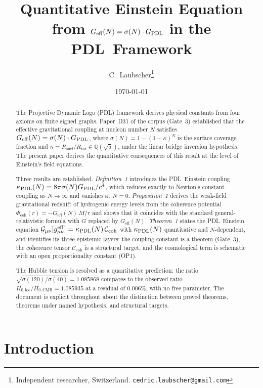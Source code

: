 \documentclass[11pt,a4paper]{article}
\theoremstyle{definition}
\newcommand{\PDL}{\textnormal{PDL}}
\newcommand{\Rsurf}{R_{\mathrm{surf}}}
\newcommand{\Rtot}{R_{\mathrm{tot}}}
\newcommand{\GPDL}{G_{\PDL}}
\newcommand{\Geff}{G_{\mathrm{eff}}}
\newcommand{\sig}{\sigma}
\newcommand{\kap}{\kappa}
\newcommand{\kPDL}{\kappa_{\PDL}}
\newcommand{\Ccoh}{\mathcal{C}_{\mathrm{coh}}}
\newcommand{\geff}{g^{\mathrm{eff}}_{\mu\nu}}
\newcommand{\Gcal}{\mathcal{G}_{\mu\nu}}
\newcommand{\Phicoh}{\Phi_{\mathrm{coh}}}
\begin{document}
\title{Quantitative Einstein Equation from $G_{\mathrm{eff}}(N) = \sigma(N)\cdot G_{\PDL}$ in the \PDL\ Framework}
\author{C.~Laubscher\thanks{Independent researcher, Switzerland. \texttt{cedric.laubscher@gmail.com}}}
\date{\small \today}
\maketitle

\begin{abstract}
The Projective Dynamic Logo (\PDL) framework derives physical constants from four axioms on finite signed graphs. Paper~D31 of the corpus (Gate~3) established that the effective gravitational coupling at nucleon number $N$ satisfies $\Geff(N) = \sig(N)\cdot\GPDL$, where $\sig(N) = 1-(1-\kap)^N$ is the surface coverage fraction and $\kap = \Rsurf/\Rtot \in \mathbb{Q}(\sqrt{5})$, under the linear bridge inversion hypothesis. The present paper derives the quantitative consequences of this result at the level of Einstein's field equations.

Three results are established. \emph{Definition~1} introduces the \PDL\ Einstein coupling $\kPDL(N) = 8\pi\sig(N)\GPDL/c^4$, which reduces exactly to Newton's constant coupling as $N\to\infty$ and vanishes at $N=0$. \emph{Proposition~1} derives the weak-field gravitational redshift of hydrogenic energy levels from the coherence potential $\Phicoh(r) = -\Geff(N)\,M/r$ and shows that it coincides with the standard general-relativistic formula with $G$ replaced by $\Geff(N)$. \emph{Theorem~1} states the \PDL\ Einstein equation $\Gcal[\geff] = \kPDL(N)\,\Ccoh$ with $\kPDL(N)$ quantitative and $N$-dependent, and identifies its three epistemic layers: the coupling constant is a theorem (Gate~3), the coherence tensor $\Ccoh$ is a structural target, and the cosmological term is schematic with an open proportionality constant (OP1).

The Hubble tension is resolved as a quantitative prediction: the ratio $\sqrt{\sig(120)/\sig(40)} = 1.085868$ compares to the observed ratio $H_{0,\mathrm{loc}}/H_{0,\mathrm{CMB}} = 1.085935$ at a residual of $0.006\%$, with no free parameter. The document is explicit throughout about the distinction between proved theorems, theorems under named hypothesis, and structural targets.
\end{abstract}

\section{Introduction}
\label{sec:intro}
\end{document}
